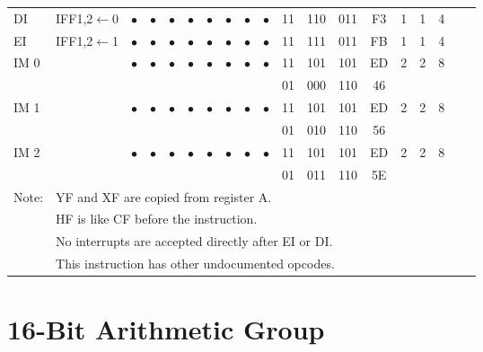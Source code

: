 \documentclass[oneside,a4paper]{book}
\begin{document}
{\begin{tabular}{llc@{ }c@{ }c@{ }c@{ }c@{ }c@{ }c@{ }cc@{ }c@{ }cccccll}
DI\footnotemark[3] & IFF1,2$\leftarrow$0 & 
	$\bullet$ & $\bullet$ & $\bullet$ & $\bullet$ & $\bullet$ & $\bullet$ & $\bullet$ & $\bullet$ & 11 & 110 & 011
	& F3 & 1 & 1 & 4 & & \\

EI\footnotemark[3] & IFF1,2$\leftarrow$1 & 
	$\bullet$ & $\bullet$ & $\bullet$ & $\bullet$ & $\bullet$ & $\bullet$ & $\bullet$ & $\bullet$ & 11 & 111 & 011
	& FB & 1 & 1 & 4 & & \\

IM 0\footnotemark[4] & & 
	$\bullet$ & $\bullet$ & $\bullet$ & $\bullet$ & $\bullet$ & $\bullet$ & $\bullet$ & $\bullet$ & 11 & 101 & 101
	& ED & 2 & 2 & 8 & & \\
\multicolumn{10}{c}{} & 01 & 000 & 110 & 46 & \multicolumn{3}{c}{} & & \\ 

IM 1\footnotemark[4] & & 
	$\bullet$ & $\bullet$ & $\bullet$ & $\bullet$ & $\bullet$ & $\bullet$ & $\bullet$ & $\bullet$ & 11 & 101 & 101
	& ED & 2 & 2 & 8 & & \\
\multicolumn{10}{c}{} & 01 & 010 & 110 & 56 & \multicolumn{3}{c}{} & & \\ 

IM 2\footnotemark[4] & & 
	$\bullet$ & $\bullet$ & $\bullet$ & $\bullet$ & $\bullet$ & $\bullet$ & $\bullet$ & $\bullet$ & 11 & 101 & 101
	& ED & 2 & 2 & 8 & & \\
\multicolumn{10}{c}{} & 01 & 011 & 110 & 5E & \multicolumn{3}{c}{} & & \\ \hline

Note: & \multicolumn{18}{l}{\parbox{12cm}{\footnotemark[1]YF and XF are copied from register A.}} \\
      & \multicolumn{18}{l}{\parbox{12cm}{\footnotemark[2]HF is like CF before the instruction.}} \\
      & \multicolumn{18}{l}{\parbox{12cm}{\footnotemark[3]No interrupts are accepted directly after EI or DI.}} \\
      & \multicolumn{18}{l}{\parbox{12cm}{\footnotemark[4]This instruction has other undocumented opcodes.}} \\ \hline

\end{tabular}
}

\section{16-Bit Arithmetic Group}
\end{document}
